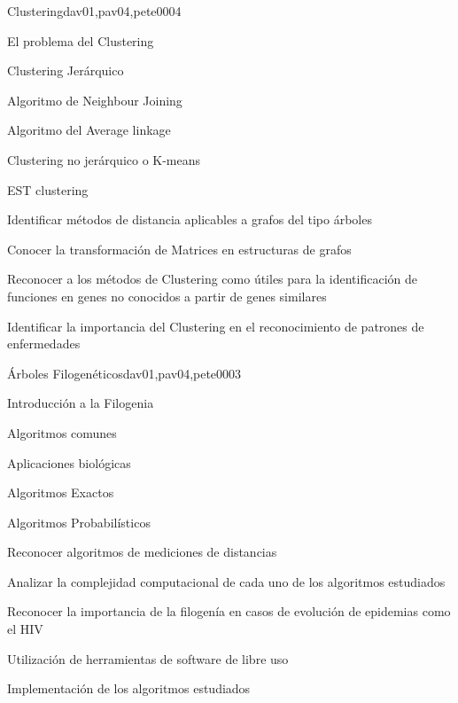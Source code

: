 \begin{syllabus}
\begin{unit}{Clustering}{dav01,pav04,pete00}{0}{4}
\begin{topics}
        \item El problema del Clustering
        \item Clustering Jerárquico
        \item Algoritmo de Neighbour Joining
        \item Algoritmo del Average linkage
        \item Clustering no jerárquico o K-means
        \item EST clustering
    \end{topics}
    \begin{learningoutcomes}
        \item Identificar métodos de distancia aplicables a grafos del tipo árboles
        \item Conocer la transformación de Matrices en estructuras de grafos
        \item Reconocer a los métodos de Clustering como útiles para la identificación de funciones en genes no conocidos a partir de genes similares
        \item Identificar la importancia del Clustering en el reconocimiento de patrones de enfermedades
    \end{learningoutcomes}
\end{unit}

\begin{unit}{Árboles Filogenéticos}{dav01,pav04,pete00}{0}{3}
\begin{topics}
        \item Introducción a la Filogenia
        \item Algoritmos comunes
        \item Aplicaciones biológicas
        \item Algoritmos Exactos
        \item Algoritmos Probabilísticos
    \end{topics}
    \begin{learningoutcomes}
        \item Reconocer algoritmos de mediciones de distancias
        \item Analizar la complejidad computacional de cada uno de los algoritmos estudiados
        \item Reconocer la importancia de la filogenía en casos de evolución de epidemias como el HIV
        \item Utilización de herramientas de software de libre uso
        \item Implementación de los algoritmos estudiados
    \end{learningoutcomes}
\end{unit}


\end{syllabus}
